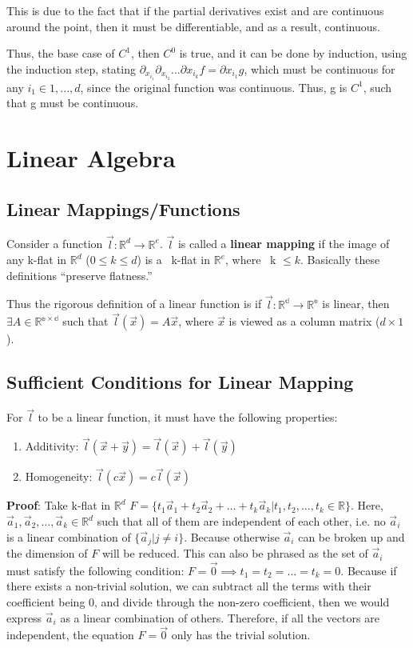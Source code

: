 \documentclass[11 pt, twoside]{article}
\begin{document}
This is due to the fact that if the partial derivatives exist and are continuous around the point, then it must be differentiable, and as a result, continuous.

Thus, the base case of $C^1$, then $C^0$ is true, and it can be done by induction, using the induction step, stating $\partial_{x_{i_1}}\partial_{x_{i_2}}...\partial{x_{i_k}}f = \partial{x_{i_1}}g$, which must be continuous for any $i_1 \in {1, ..., d}$, since the original function was continuous. Thus, g is $C^1$, such that g must be continuous.

\section{Linear Algebra}
\subsection{Linear Mappings/Functions}

Consider a function $\vec{l}: \mathbb{R}^d \to \mathbb{R}^e$. $\vec{l}$ is
called a \textbf{linear mapping} if the image of any k-flat in $\mathbb{R}^d$
($0 \leq k \leq d$) is a ~k-flat in $\mathbb{R}^e$, where ~k $\leq k$.
Basically these definitions ``preserve flatness.''

Thus the rigorous definition of a linear function is if $\vec{l}: \mathbb{R^d} \to \mathbb{R^e}$ is linear, then $\exists A \in \mathbb{R^{e \times d}}$ such that $\vec{l}(\vec{x}) = A\vec{x}$, where $\vec{x}$ is viewed as a column matrix ($d \times 1$).

\subsection{Sufficient Conditions for Linear Mapping}
For $\vec{l}$ to be a linear function, it must have the following properties:

\begin{enumerate}
\item Additivity: $\vec{l}(\vec{x} + \vec{y}) = \vec{l}(\vec{x}) +
\vec{l}(\vec{y})$
\item Homogeneity: $\vec{l}(c\vec{x}) = c\vec{l}(\vec{x})$
\end{enumerate}
\vspace{0.2cm}

\textbf{Proof}: Take k-flat in $\mathbb{R}^d$ $F = \{t_1\vec{a}_1 +
t_2\vec{a}_2 + \dots + t_k\vec{a}_k | t_1, t_2, \dots, t_k \in
\mathbb{R}\}$. Here, $\vec{a}_1, \vec{a}_2, \dots, \vec{a}_k \in
\mathbb{R}^d$ such that all of them are independent of each other, i.e. no
$\vec{a}_i$ is a linear combination of $\{\vec{a}_j | j \neq i\}$. Because
otherwise $\vec{a}_i$ can be broken up and the dimension of $F$ will be reduced.
This can also be phrased as the set of $\vec{a}_i$ must satisfy the following condition:
$F = \vec{0} \implies t_1 = t_2 = \dots = t_k = 0$. Because if there exists a
non-trivial solution, we can subtract all the terms with their coefficient being
0, and divide through the non-zero coefficient, then we would express
$\vec{a}_i$ as a linear combination of others. Therefore, if all the vectors are
independent, the equation $F = \vec{0}$ only has the trivial solution.
\end{document}
